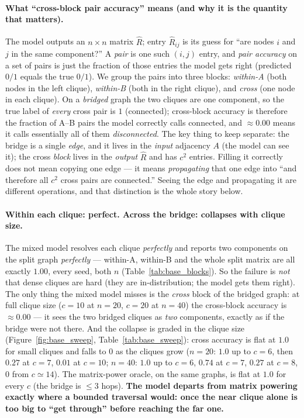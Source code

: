 \documentclass[11pt,a4paper]{article}
\begin{document}
\paragraph{What ``cross-block pair accuracy'' means (and why it is the quantity that matters).}
The model outputs an $n\times n$ matrix $\hat R$; entry $\hat R_{ij}$ is its guess for ``are nodes
$i$ and $j$ in the same component?'' A \emph{pair} is one such $(i,j)$ entry, and \emph{pair
accuracy} on a set of pairs is just the fraction of those entries the model gets right (predicted
$0/1$ equals the true $0/1$). We group the pairs into three blocks: \emph{within-A} (both nodes in
the left clique), \emph{within-B} (both in the right clique), and \emph{cross} (one node in each
clique). On a \emph{bridged} graph the two cliques are one component, so the true label of
\emph{every} cross pair is $1$ (connected); cross-block accuracy is therefore the fraction of A--B
pairs the model correctly calls connected, and $\approx 0.00$ means it calls essentially all of
them \emph{disconnected}. The key thing to keep separate: the bridge is a single \emph{edge}, and
it lives in the \emph{input} adjacency $A$ (the model can see it); the cross \emph{block} lives in
the \emph{output} $\hat R$ and has $c^2$ entries. Filling it correctly does not mean copying one
edge --- it means \emph{propagating} that one edge into ``and therefore all $c^2$ cross pairs are
connected.'' Seeing the edge and propagating it are different operations, and that distinction is
the whole story below.

\paragraph{Within each clique: perfect. Across the bridge: collapses with clique size.} The mixed
model resolves each clique \emph{perfectly} and reports two components on the split graph
\emph{perfectly} --- within-A, within-B and the whole split matrix are all exactly $1.00$, every
seed, both $n$ (Table~\ref{tab:base_blocks}). So the failure is \emph{not} that dense cliques are
hard (they are in-distribution; the model gets them right). The only thing the mixed model misses
is the \emph{cross} block of the bridged graph: at full clique size ($c=10$ at $n=20$, $c=20$ at
$n=40$) the cross-block accuracy is $\approx 0.00$ --- it sees the two bridged cliques as
\emph{two} components, exactly as if the bridge were not there. And the collapse is graded in the
clique size (Figure~\ref{fig:base_sweep}, Table~\ref{tab:base_sweep}): cross accuracy is flat at
$1.0$ for small cliques and falls to $0$ as the cliques grow ($n=20$: $1.0$ up to $c=6$, then
$0.27$ at $c=7$, $0.01$ at $c=10$; $n=40$: $1.0$ up to $c=6$, $0.74$ at $c=7$, $0.27$ at $c=8$,
$0$ from $c\simeq14$). The matrix-power oracle, on the same graphs, is flat at $1.0$ for every $c$
(the bridge is $\le 3$ hops). \textbf{The model departs from matrix powering exactly where a
bounded traversal would: once the near clique alone is too big to ``get through'' before reaching
the far one.}
\end{document}
